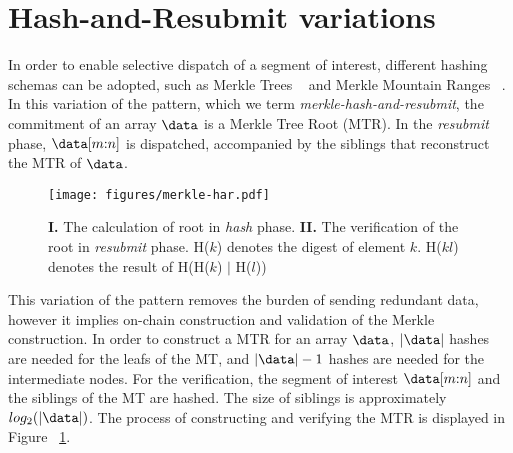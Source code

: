 \section{Hash-and-Resubmit variations}
\label{sec:hash-appendix}
In order to enable selective dispatch of a segment of interest, different
hashing schemas can be adopted, such as Merkle Trees ~\cite{merkle} and Merkle Mountain
Ranges ~\cite{mmr-1,mmr-2}. In this variation of the pattern, which we term
\emph{merkle-hash-and-resubmit}, the commitment of an array $\data$ is
a Merkle Tree Root (MTR). In the \emph{resubmit} phase, $\data[m{:}n]$ is
dispatched, accompanied by the siblings that reconstruct the MTR of
$\data$.

\begin{figure}
    \centering
    \texttt{[image: figures/merkle-har.pdf]}
    \caption{\textbf{I.} The calculation of root in \emph{hash} phase.
    \textbf{II.} The verification of the root in \emph{resubmit} phase.
    \textsf{H}($k$) denotes the digest of element $k$. \textsf{H}($kl$) denotes the
    result of \textsf{H}(\textsf{H}($k$) $|$ \textsf{H}($l$))}
    \label{fig:merkle-har}
\end{figure}

This variation of the pattern removes the burden of sending redundant data,
however it implies on-chain construction and validation of the Merkle
construction. In order to construct a MTR for an array $\data$,
$|\data|$ hashes are needed for the leafs of the MT, and $|\data| -
1$ hashes are needed for the intermediate nodes. For the verification, the
segment of interest $\data[m{:}n]$ and the siblings of the MT are hashed.
The size of siblings is approximately $log_2(|\data|)$. The process of
constructing and verifying the MTR is displayed in Figure
~\ref{fig:merkle-har}.

